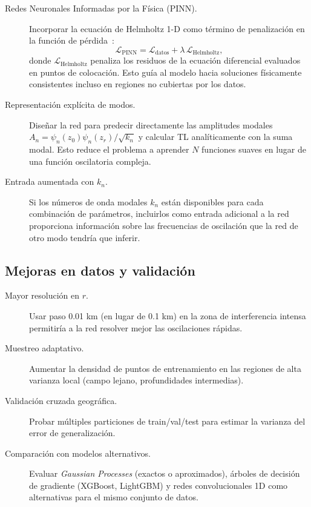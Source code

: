 \documentclass[12pt,a4paper]{article}
\begin{document}
\begin{description}
  \item[Redes Neuronales Informadas por la Física (PINN).~]
    Incorporar la ecuación de Helmholtz 1-D como término de penalización en
    la función de pérdida~\cite{raissi2019}:
    \begin{equation}
      \mathcal{L}_{\text{PINN}} = \mathcal{L}_{\text{datos}} +
      \lambda\,\mathcal{L}_{\text{Helmholtz}},
    \end{equation}
    donde $\mathcal{L}_{\text{Helmholtz}}$ penaliza los residuos de la
    ecuación diferencial evaluados en puntos de colocación. Esto guía al
    modelo hacia soluciones físicamente consistentes incluso en regiones
    no cubiertas por los datos.

  \item[Representación explícita de modos.~]
    Diseñar la red para predecir directamente las amplitudes modales
    $A_n = \psi_n(z_0)\psi_n(z_r)/\sqrt{k_n}$ y calcular TL analíticamente
    con la suma modal. Esto reduce el problema a aprender $N$ funciones
    suaves en lugar de una función oscilatoria compleja.

  \item[Entrada aumentada con $k_n$.~]
    Si los números de onda modales $k_n$ están disponibles para cada
    combinación de parámetros, incluirlos como entrada adicional a la red
    proporciona información sobre las frecuencias de oscilación que la red
    de otro modo tendría que inferir.
\end{description}

\subsection{Mejoras en datos y validación}

\begin{description}
  \item[Mayor resolución en $r$.~]
    Usar paso 0.01 km (en lugar de 0.1 km) en la zona de interferencia
    intensa permitiría a la red resolver mejor las oscilaciones rápidas.
  \item[Muestreo adaptativo.~]
    Aumentar la densidad de puntos de entrenamiento en las regiones de alta
    varianza local (campo lejano, profundidades intermedias).
  \item[Validación cruzada geográfica.~]
    Probar múltiples particiones de train/val/test para estimar la varianza
    del error de generalización.
  \item[Comparación con modelos alternativos.~]
    Evaluar \emph{Gaussian Processes} (exactos o aproximados), árboles
    de decisión de gradiente (XGBoost, LightGBM) y redes convolucionales
    1D como alternativas para el mismo conjunto de datos.
\end{description}
\end{document}
